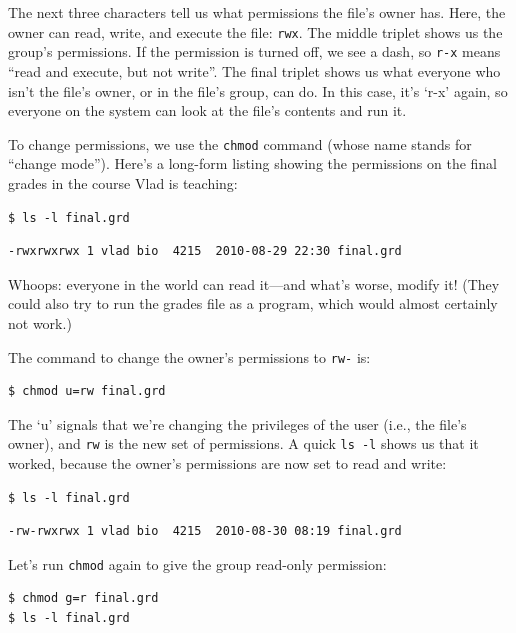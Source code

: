 \documentclass{book}
\begin{document}
The next three characters tell us what permissions the file's owner has.
Here, the owner can read, write, and execute the file: \texttt{rwx}. The
middle triplet shows us the group's permissions. If the permission is
turned off, we see a dash, so \texttt{r-x} means ``read and execute, but
not write''. The final triplet shows us what everyone who isn't the
file's owner, or in the file's group, can do. In this case, it's `r-x'
again, so everyone on the system can look at the file's contents and run
it.

To change permissions, we use the \texttt{chmod} command (whose name
stands for ``change mode''). Here's a long-form listing showing the
permissions on the final grades in the course Vlad is teaching:

\begin{verbatim}
$ ls -l final.grd
\end{verbatim}

\begin{verbatim}
-rwxrwxrwx 1 vlad bio  4215  2010-08-29 22:30 final.grd
\end{verbatim}

Whoops: everyone in the world can read it---and what's worse, modify it!
(They could also try to run the grades file as a program, which would
almost certainly not work.)

The command to change the owner's permissions to \texttt{rw-} is:

\begin{verbatim}
$ chmod u=rw final.grd
\end{verbatim}

The `u' signals that we're changing the privileges of the user (i.e.,
the file's owner), and \texttt{rw} is the new set of permissions. A
quick \texttt{ls -l} shows us that it worked, because the owner's
permissions are now set to read and write:

\begin{verbatim}
$ ls -l final.grd
\end{verbatim}

\begin{verbatim}
-rw-rwxrwx 1 vlad bio  4215  2010-08-30 08:19 final.grd
\end{verbatim}

Let's run \texttt{chmod} again to give the group read-only permission:

\begin{verbatim}
$ chmod g=r final.grd
$ ls -l final.grd
\end{verbatim}
\end{document}
